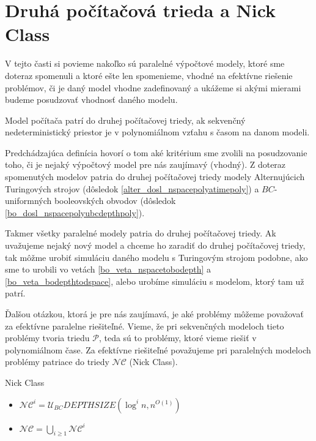 {\section{Druhá počítačová trieda a Nick Class}

V tejto časti si povieme nakoľko sú paralelné výpočtové modely, ktoré sme doteraz spomenuli a ktoré
ešte len spomenieme, vhodné na efektívne riešenie problémov, či je daný model vhodne zadefinovaný a
ukážeme si akými mierami budeme posudzovať vhodnosť daného modelu.

\begin{definicia}
  Model počítača patrí do druhej počítačovej triedy, ak sekvenčný nedeterministický
  priestor je v polynomiálnom vzťahu s časom na danom modeli.
\end{definicia}

Predchádzajúca definícia hovorí o tom aké kritérium sme zvolili na posudzovanie toho, či je nejaký
výpočtový model pre nás zaujímavý (vhodný). Z doteraz spomenutých modelov patria do druhej
počítačovej triedy modely Alternujúcich Turingových strojov (dôsledok
\ref{alter_dosl_nspacepolyatimepoly}) a $BC$-uniformných booleovských obvodov (dôsledok
\ref{bo_dosl_nspacepolyubcdepthpoly}).

Takmer všetky paralelné modely patria do druhej počítačovej triedy. Ak uvažujeme nejaký nový model
a chceme ho zaradiť do druhej počítačovej triedy, tak môžme urobiť simuláciu daného modelu s
Turingovým strojom podobne, ako sme to urobili vo vetách \ref{bo_veta_nspacetobodepth} a
\ref{bo_veta_bodepthtodspace}, alebo urobíme simuláciu s modelom, ktorý tam už patrí.

Ďalšou otázkou, ktorá je pre nás zaujímavá, je aké problémy môžeme považovať za efektívne paralelne
riešiteľné. Vieme, že pri sekvenčných modeloch tieto problémy tvoria triedu $\mathcal{P}$, teda sú
to problémy, ktoré vieme riešiť v polynomiálnom čase. Za efektívne riešiteľné považujeme pri
paralelných modeloch problémy patriace do triedy $\mathcal{NC}$ (Nick Class).

\pagebreak

\begin{definicia}
  Nick Class
  \begin{itemize}
    \item $\mathcal{NC}^i=\mathcal{U}_{BC}DEPTHSIZE(\log^i n,n^{O(1)})$
    \item $\mathcal{NC}=\bigcup\limits_{i\geq 1} \mathcal{NC}^i$
  \end{itemize}
\end{definicia}

}
